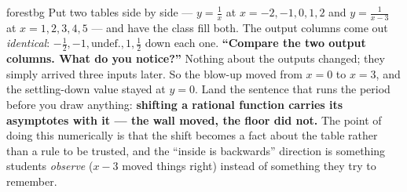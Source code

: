 \documentclass[10pt]{article}
\begin{document}
\begin{skillbox}[Hook]{forestbg}
    Put two tables side by side --- $y=\frac1x$ at $x=-2,-1,0,1,2$ and $y=\frac{1}{x-3}$ at
    $x=1,2,3,4,5$ --- and have the class fill both. The output columns come out \emph{identical}:
    $-\frac12,-1,\text{undef.},1,\frac12$ down each one. \textbf{``Compare the two output columns. What
    do you notice?''} Nothing about the outputs changed; they simply arrived three inputs later. So the
    blow-up moved from $x=0$ to $x=3$, and the settling-down value stayed at $y=0$. Land the sentence
    that runs the period before you draw anything: \textbf{shifting a rational function carries its
    asymptotes with it --- the wall moved, the floor did not.} The point of doing this numerically is
    that the shift becomes a fact about the table rather than a rule to be trusted, and the ``inside is
    backwards'' direction is something students \emph{observe} ($x-3$ moved things right) instead of
    something they try to remember.
\end{skillbox}
\end{document}
